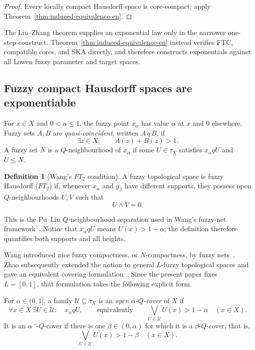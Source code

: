 \documentclass[11pt,a4paper]{article}
\numberwithin{equation}{section}
\theoremstyle{definition}
\newtheorem{definition}[theorem]{Definition}
\theoremstyle{remark}
\begin{document}
\begin{proof}
Every locally compact Hausdorff space is core-compact; apply
Theorem~\ref{thm:induced-equivalence-en}.
\end{proof}

The Liu--Zhang theorem supplies an exponential law only in the
narrower one-step construct.  Theorem~\ref{thm:induced-equivalence-en}
instead verifies FTC, compatible cores, and SKA directly, and therefore
constructs exponentials against all Lowen fuzzy parameter and target
spaces.

\subsection{Fuzzy compact Hausdorff spaces are exponentiable}

For \(x\in X\) and \(0<\alpha\leq1\), the fuzzy point \(x_\alpha\)
has value \(\alpha\) at \(x\) and \(0\) elsewhere.  Fuzzy sets \(A,B\)
are \emph{quasi-coincident}, written \(A\,q\,B\), if
\[
 \exists z\in X,\qquad A(z)+B(z)>1.
\]
A fuzzy set \(N\) is a \(Q\)-neighbourhood of \(x_\alpha\) if some
\(U\in\tau_X\) satisfies \(x_\alpha qU\) and \(U\leq N\).

\begin{definition}[Wang's \(FT_2\) condition]\label{def:ft2-en}
A fuzzy topological space is fuzzy Hausdorff (\(FT_2\)) if, whenever
\(x_\alpha\) and \(y_\beta\) have different supports, they possess open
\(Q\)-neighbourhoods \(U,V\) such that
\begin{equation}\label{eq:ft2-en}
 U\wedge V=0.
\end{equation}
\end{definition}

This is the Pu--Liu \(Q\)-neighbourhood separation used in Wang's
fuzzy-net framework~\cite{PuLiu1980-en,Srivastava1981-en,Wang1983-en}.
Notice that \(x_\alpha qU\) means
\(U(x)>1-\alpha\); the definition therefore quantifies both supports
and all heights.

Wang introduced nice fuzzy compactness, or \(N\)-compactness, by fuzzy
nets~\cite{Wang1983-en}.  Zhao subsequently extended the notion to
general \(L\)-fuzzy topological spaces and gave an equivalent covering
formulation~\cite{Zhao1987-en}.  Since the present paper fixes
\(L=[0,1]\), that formulation takes the following explicit form.

For \(\alpha\in(0,1]\), a family
\(\mathcal U\subseteq\tau_X\) is an \emph{open
\(\alpha\)-\(Q\)-cover} of \(X\) if
\begin{equation}\label{eq:alpha-q-cover-en}
 \forall x\in X\ \exists U\in\mathcal U:\quad x_\alpha qU,
 \qquad\text{equivalently}\qquad
 \bigvee_{U\in\mathcal U}U(x)>1-\alpha\quad(x\in X).
\end{equation}
It is an \(\alpha^{-}\)-\(Q\)-cover if there is one
\(\beta\in(0,\alpha)\) for which it is a \(\beta\)-\(Q\)-cover, that is,
\begin{equation}\label{eq:alpha-minus-q-cover-en}
 \bigvee_{U\in\mathcal U}U(x)>1-\beta\quad(x\in X).
\end{equation}
\end{document}
